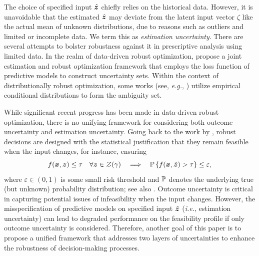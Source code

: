 \documentclass[opre, nonblindrev]{informswp}
\newcommand{\1}[1]{\mathds{1}{\left(#1\right)}}
\begin{document}
The choice of specified input $\hat{\bm{z}}$ chiefly relies on the historical data. However, it is unavoidable that the estimated $\hat{\bm{z}}$ may deviate from the latent input vector $\zeta$ like the actual mean of unknown distributions, due to reasons such as outliers and limited or incomplete data. We term this as \emph{estimation uncertainty}. There are several attempts to bolster robustness against it in prescriptive analysis using limited data. In the realm of data-driven robust optimization, \cite{Zhu_Xie_Sim_2021joint} propose a joint estimation and robust optimization framework that employs the loss function of predictive models to construct uncertainty sets. 
Within the context of distributionally robust optimization, some works (see, \textit{e.g.}, \citealt{bertsimas2022bootstrap, Esteban_Morales_2021distributionally,Bertsimas_McCord_Sturt_2022dynamic}) utilize empirical conditional distributions to form the ambiguity set. 

While significant recent progress has been made in data-driven robust optimization, there is no unifying framework for considering both outcome uncertainty and estimation uncertainty. Going back to the work by \cite{bertsimas2004price}, robust decisions are designed with the statistical justification that they remain feasible when the input changes, for instance, ensuring 
\[
f(\bm x, \bm z) \leq \tau \quad \forall \bm z \in \mathcal{Z}(\gamma) ~~~\Longrightarrow~~~
\mathbb{P}\left\{f(\bm x, \tilde{\bm{z}}) > \tau\right\} \leq \varepsilon,
\]
where $\varepsilon \in (0,1)$ is some small risk threshold and $\mathbb{P}$ denotes the underlying true (but unknown) probability distribution; see also \cite{bertsimas2021probabilistic}. Outcome uncertainty is critical in capturing potential issues of infeasibility when the input changes.
However, the misspecification of predictive models on specified input $\hat{\bm{z}}$ (\textit{i.e.}, estimation uncertainty) can lead to degraded performance on the feasibility profile if only outcome uncertainty is considered. Therefore, another goal of this paper is to propose a unified framework that addresses two layers of uncertainties to enhance the robustness of decision-making processes.
\end{document}

